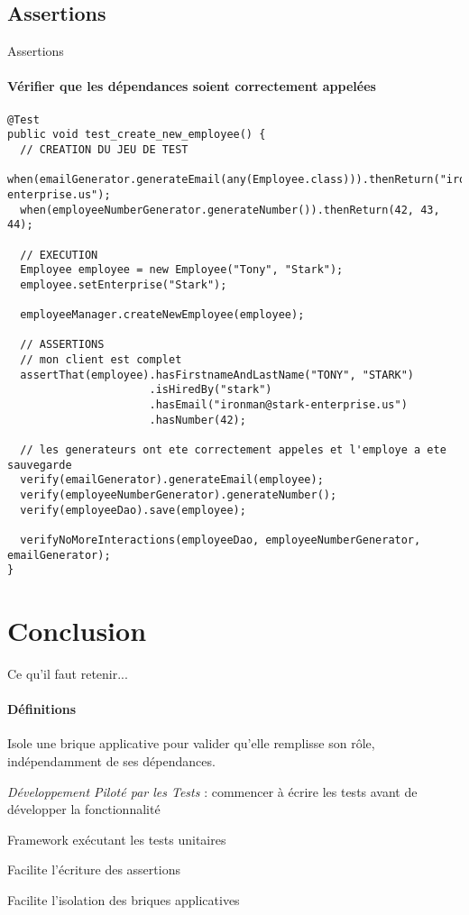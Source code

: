 \documentclass[compress]{beamer}%
\begin{document}
\subsection{Assertions}
\begin{frame}[containsverbatim]{Assertions}
	\framesubtitle{Vérifier que les dépendances soient correctement appelées}

	\begin{lstlisting}
@Test
public void test_create_new_employee() {
  // CREATION DU JEU DE TEST
  when(emailGenerator.generateEmail(any(Employee.class))).thenReturn("ironman@stark-enterprise.us");
  when(employeeNumberGenerator.generateNumber()).thenReturn(42, 43, 44);
  
  // EXECUTION
  Employee employee = new Employee("Tony", "Stark");
  employee.setEnterprise("Stark");
  
  employeeManager.createNewEmployee(employee);
  
  // ASSERTIONS
  // mon client est complet
  assertThat(employee).hasFirstnameAndLastName("TONY", "STARK")
  					  .isHiredBy("stark")
  					  .hasEmail("ironman@stark-enterprise.us")
  					  .hasNumber(42);
  
  // les generateurs ont ete correctement appeles et l'employe a ete sauvegarde
  verify(emailGenerator).generateEmail(employee);
  verify(employeeNumberGenerator).generateNumber();
  verify(employeeDao).save(employee);
  
  verifyNoMoreInteractions(employeeDao, employeeNumberGenerator, emailGenerator);
}
\end{lstlisting}
	
\end{frame}

\section{Conclusion}

\begin{frame}{Ce qu'il faut retenir...}
	\framesubtitle{Définitions}

	\begin{description}[<+->]
	\item[Tests unitaires] Isole une brique applicative pour valider qu'elle remplisse son rôle, indépendamment de ses dépendances.
	\item[TDD] \emph{Développement Piloté par les Tests} : commencer à écrire les tests avant de développer la fonctionnalité
	\item[JUNIT] Framework exécutant les tests unitaires
	\item[FestAssert] Facilite l'écriture des assertions
	\item[Mockito] Facilite l'isolation des briques applicatives
	\end{description}
	
\end{frame}
\end{document}
